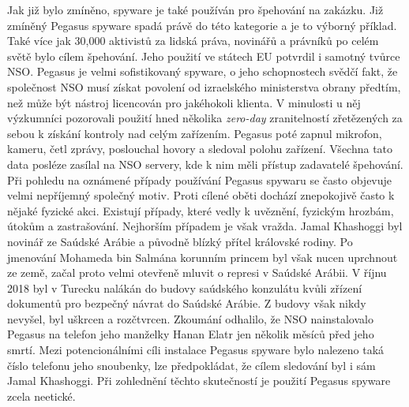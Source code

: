 Jak již bylo zmíněno, spyware je také používán pro špehování na zakázku.
Již zmíněný Pegasus spyware spadá právě do této kategorie a je to výborný příklad.
Také více jak 30,000 aktivistů za lidská práva, novinářů a právníků po celém světě bylo cílem špehování.
Jeho použití ve státech \ac{EU} potvrdil i samotný tvůrce NSO\@.
Pegasus je velmi sofistikovaný spyware, o jeho schopnostech svědčí fakt, že společnost NSO musí získat povolení od izraelského ministerstva obrany předtím, než může být nástroj licencován pro jakéhokoli klienta.
V minulosti u něj výzkumníci pozorovali použití hned několika \textit{zero-day} zranitelností zřetězených za sebou k získání kontroly nad celým zařízením.
Pegasus poté zapnul mikrofon, kameru, četl zprávy, poslouchal hovory a sledoval polohu zařízení.
Všechna tato data posléze zasílal na NSO servery, kde k nim měli přístup zadavatelé špehování.
Při pohledu na oznámené případy používání Pegasus spywaru se často objevuje velmi nepříjemný společný motiv.
Proti cílené oběti dochází znepokojivě často k nějaké fyzické akci.
Existují případy, které vedly k uvěznění, fyzickým hrozbám, útokům a zastrašování.
Nejhorším případem je však vražda.
Jamal Khashoggi byl novinář ze Saúdské Arábie a původně blízký přítel královské rodiny.
Po jmenování Mohameda bin Salmána korunním princem byl však nucen uprchnout ze země, začal proto velmi otevřeně mluvit o represi v Saúdské Arábii.
V říjnu 2018 byl v Turecku nalákán do budovy saúdského konzulátu kvůli zřízení dokumentů pro bezpečný návrat do Saúdské Arábie.
Z budovy však nikdy nevyšel, byl uškrcen a rozčtvrcen.
Zkoumání odhalilo, že NSO nainstalovalo Pegasus na telefon jeho manželky Hanan Elatr jen několik měsíců před jeho smrtí\cite{khashoggi_wife_pegasus}.
Mezi potencionálními cíli instalace Pegasus spyware bylo nalezeno taká číslo telefonu jeho snoubenky, lze předpokládat, že cílem sledování byl i sám Jamal Khashoggi.
Při zohlednění těchto skutečností je použití Pegasus spyware zcela neetické.\cite{darknet_100_NSO,Enisa_thread_landscape}

